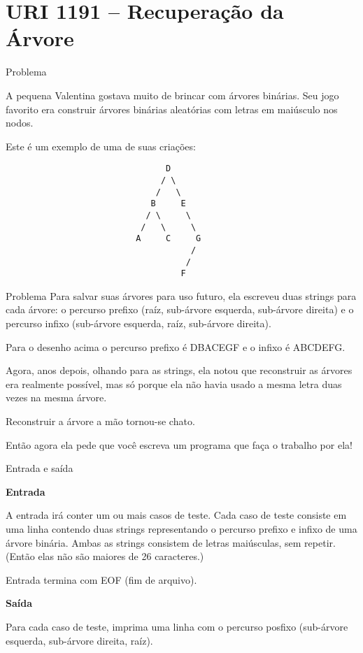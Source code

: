 \section{URI 1191 -- Recuperação da Árvore}

\begin{frame}[fragile]{Problema}

A pequena Valentina gostava muito de brincar com árvores binárias. Seu jogo favorito era construir árvores binárias aleatórias com letras em maiúsculo nos nodos.

Este é um exemplo de uma de suas criações:
 
\begin{verbatim}
                                D
                               / \
                              /   \
                             B     E
                            / \     \
                           /   \     \
                          A     C     G
                                     /
                                    /
                                   F
\end{verbatim}
\end{frame}
 

\begin{frame}[fragile]{Problema}
Para salvar suas árvores para uso futuro, ela escreveu duas strings para cada árvore: o percurso prefixo (raíz, sub-árvore esquerda, sub-árvore direita) e o percurso infixo (sub-árvore esquerda, raíz, sub-árvore direita).

Para o desenho acima o percurso prefixo é DBACEGF e o infixo é ABCDEFG.

Agora, anos depois, olhando para as strings, ela notou que reconstruir as árvores era realmente possível, mas só porque ela não havia usado a mesma letra duas vezes na mesma árvore.

Reconstruir a árvore a mão tornou-se chato.

Então agora ela pede que você escreva um programa que faça o trabalho por ela!

\end{frame}

\begin{frame}[fragile]{Entrada e saída}

\textbf{Entrada}

A entrada irá conter um ou mais casos de teste. Cada caso de teste consiste em uma linha contendo duas strings representando o percurso prefixo e infixo de uma árvore binária. Ambas as strings consistem de letras maiúsculas, sem repetir. (Então elas não são maiores de 26 caracteres.)

Entrada termina com EOF (fim de arquivo).

\vspace{0.2in}

\textbf{Saída}

Para cada caso de teste, imprima uma linha com o percurso posfixo (sub-árvore esquerda, sub-árvore direita, raíz).

\end{frame}


